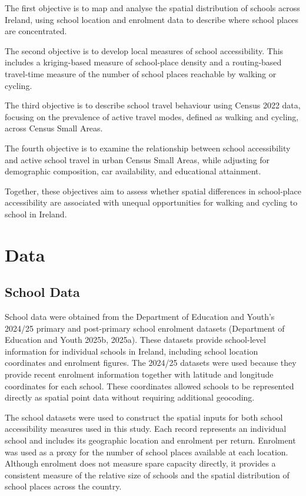 \documentclass{article}
\begin{document}
The first objective is to map and analyse the spatial distribution of
schools across Ireland, using school location and enrolment data to
describe where school places are concentrated.

The second objective is to develop local measures of school
accessibility. This includes a kriging-based measure of school-place
density and a routing-based travel-time measure of the number of school
places reachable by walking or cycling.

The third objective is to describe school travel behaviour using Census
2022 data, focusing on the prevalence of active travel modes, defined as
walking and cycling, across Census Small Areas.

The fourth objective is to examine the relationship between school
accessibility and active school travel in urban Census Small Areas,
while adjusting for demographic composition, car availability, and
educational attainment.

Together, these objectives aim to assess whether spatial differences in
school-place accessibility are associated with unequal opportunities for
walking and cycling to school in Ireland.

\section{Data}\label{data}

\subsection{School Data}\label{school-data}

School data were obtained from the Department of Education and Youth's
2024/25 primary and post-primary school enrolment datasets (Department
of Education and Youth 2025b, 2025a). These datasets provide
school-level information for individual schools in Ireland, including
school location coordinates and enrolment figures. The 2024/25 datasets
were used because they provide recent enrolment information together
with latitude and longitude coordinates for each school. These
coordinates allowed schools to be represented directly as spatial point
data without requiring additional geocoding.

The school datasets were used to construct the spatial inputs for both
school accessibility measures used in this study. Each record represents
an individual school and includes its geographic location and enrolment
per return. Enrolment was used as a proxy for the number of school
places available at each location. Although enrolment does not measure
spare capacity directly, it provides a consistent measure of the
relative size of schools and the spatial distribution of school places
across the country.
\end{document}
